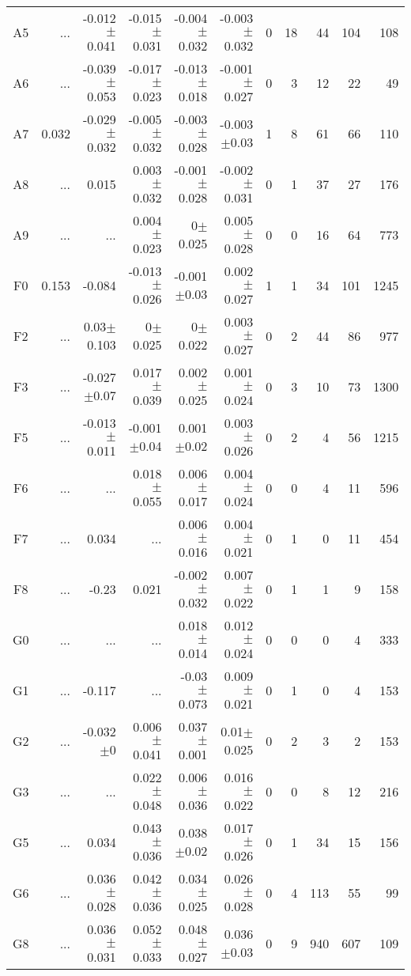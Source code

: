 \begin{table}[t]
\begin{center}
\begin{tabular}{c|rrrrr|rrrrr}
A5	&	 ...	&	-0.012$\pm$0.041	&	-0.015$\pm$0.031	&	-0.004$\pm$0.032	&	-0.003$\pm$0.032	&	0	&	18	&	44	&	104	&	108	\\
A6	&	 ...	&	-0.039$\pm$0.053	&	-0.017$\pm$0.023	&	-0.013$\pm$0.018	&	-0.001$\pm$0.027	&	0	&	3	&	12	&	22	&	49	\\
A7	&	0.032	&	-0.029$\pm$0.032	&	-0.005$\pm$0.032	&	-0.003$\pm$0.028	&	-0.003$\pm$0.03	&	1	&	8	&	61	&	66	&	110	\\
A8	&	 ...	&	0.015	&	0.003$\pm$0.032	&	-0.001$\pm$0.028	&	-0.002$\pm$0.031	&	0	&	1	&	37	&	27	&	176	\\
A9	&	 ...	&	 ...	&	0.004$\pm$0.023	&	0$\pm$0.025	&	0.005$\pm$0.028	&	0	&	0	&	16	&	64	&	773	\\
F0	&	0.153	&	-0.084	&	-0.013$\pm$0.026	&	-0.001$\pm$0.03	&	0.002$\pm$0.027	&	1	&	1	&	34	&	101	&	1245	\\
F2	&	 ...	&	0.03$\pm$0.103	&	0$\pm$0.025	&	0$\pm$0.022	&	0.003$\pm$0.027	&	0	&	2	&	44	&	86	&	977	\\
F3	&	 ...	&	-0.027$\pm$0.07	&	0.017$\pm$0.039	&	0.002$\pm$0.025	&	0.001$\pm$0.024	&	0	&	3	&	10	&	73	&	1300	\\
F5	&	 ...	&	-0.013$\pm$0.011	&	-0.001$\pm$0.04	&	0.001$\pm$0.02	&	0.003$\pm$0.026	&	0	&	2	&	4	&	56	&	1215	\\
F6	&	 ...	&	 ...	&	0.018$\pm$0.055	&	0.006$\pm$0.017	&	0.004$\pm$0.024	&	0	&	0	&	4	&	11	&	596	\\
F7	&	 ...	&	0.034	&	 ...	&	0.006$\pm$0.016	&	0.004$\pm$0.021	&	0	&	1	&	0	&	11	&	454	\\
F8	&	 ...	&	-0.23	&	0.021	&	-0.002$\pm$0.032	&	0.007$\pm$0.022	&	0	&	1	&	1	&	9	&	158	\\
G0	&	 ...	&	 ...	&	 ...	&	0.018$\pm$0.014	&	0.012$\pm$0.024	&	0	&	0	&	0	&	4	&	333	\\
G1	&	 ...	&	-0.117	&	 ...	&	-0.03$\pm$0.073	&	0.009$\pm$0.021	&	0	&	1	&	0	&	4	&	153	\\
G2	&	 ...	&	-0.032$\pm$0	&	0.006$\pm$0.041	&	0.037$\pm$0.001	&	0.01$\pm$0.025	&	0	&	2	&	3	&	2	&	153	\\
G3	&	 ...	&	 ...	&	0.022$\pm$0.048	&	0.006$\pm$0.036	&	0.016$\pm$0.022	&	0	&	0	&	8	&	12	&	216	\\
G5	&	 ...	&	0.034	&	0.043$\pm$0.036	&	0.038$\pm$0.02	&	0.017$\pm$0.026	&	0	&	1	&	34	&	15	&	156	\\
G6	&	 ...	&	0.036$\pm$0.028	&	0.042$\pm$0.036	&	0.034$\pm$0.025	&	0.026$\pm$0.028	&	0	&	4	&	113	&	55	&	99	\\
G8	&	 ...	&	0.036$\pm$0.031	&	0.052$\pm$0.033	&	0.048$\pm$0.027	&	0.036$\pm$0.03	&	0	&	9	&	940	&	607	&	109	\\

\end{tabular}
\end{center}
\end{table}
